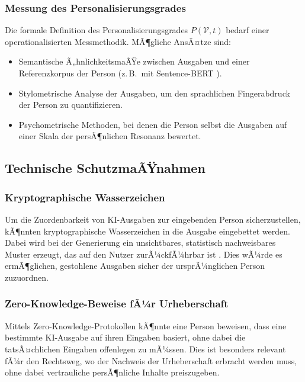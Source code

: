 ﻿\documentclass[a4paper,12pt]{article}
\theoremstyle{definition}
\begin{document}
\subsubsection{Messung des Personalisierungsgrades}

Die formale Definition des Personalisierungsgrades $P(\mathcal{V}, t)$ bedarf einer
operationalisierten Messmethodik. MÃ¶gliche AnsÃ¤tze sind:
\begin{itemize}
    \item Semantische Ã„hnlichkeitsmaÃŸe zwischen Ausgaben und einer Referenzkorpus der Person
          (z.\,B.\ mit Sentence-BERT \cite{reimers2019sentencebert}).
    \item Stylometrische Analyse der Ausgaben, um den sprachlichen Fingerabdruck der Person
          zu quantifizieren.
    \item Psychometrische Methoden, bei denen die Person selbst die Ausgaben auf einer
          Skala der persÃ¶nlichen Resonanz bewertet.
\end{itemize}

\subsection{Technische SchutzmaÃŸnahmen}

\subsubsection{Kryptographische Wasserzeichen}

Um die Zuordenbarkeit von KI-Ausgaben zur eingebenden Person sicherzustellen, kÃ¶nnten
kryptographische Wasserzeichen in die Ausgabe eingebettet werden. Dabei wird bei der
Generierung ein unsichtbares, statistisch nachweisbares Muster erzeugt, das auf den
Nutzer zurÃ¼ckfÃ¼hrbar ist \cite{kirchenbauer2023watermark}. Dies wÃ¼rde es ermÃ¶glichen,
gestohlene Ausgaben sicher der ursprÃ¼nglichen Person zuzuordnen.

\subsubsection{Zero-Knowledge-Beweise fÃ¼r Urheberschaft}

Mittels Zero-Knowledge-Protokollen \cite{goldwasser1989knowledge} kÃ¶nnte eine Person
beweisen, dass eine bestimmte KI-Ausgabe auf ihren Eingaben basiert, ohne dabei die
tatsÃ¤chlichen Eingaben offenlegen zu mÃ¼ssen. Dies ist besonders relevant fÃ¼r den
Rechtsweg, wo der Nachweis der Urheberschaft erbracht werden muss, ohne dabei
vertrauliche persÃ¶nliche Inhalte preiszugeben.
\end{document}

